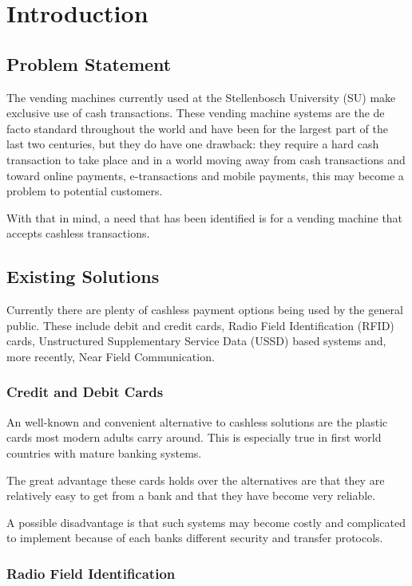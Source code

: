 \chapter{Introduction}

\section{Problem Statement}

The vending machines currently used at the Stellenbosch University (SU) make exclusive use of
cash transactions. These vending machine systems are the de facto standard throughout the
world and have been for the largest part of the last two centuries, but they do have one
drawback: they require a hard cash transaction to take place and in a world moving away from
cash transactions and toward online payments, e-transactions and mobile payments, this may
become a problem to potential customers.

With that in mind, a need that has been identified is for a vending machine that accepts
cashless transactions.

\section{Existing Solutions}

Currently there are plenty of cashless payment options being used by the general public. These
include debit and credit cards, Radio Field Identification (RFID) cards, Unstructured
Supplementary Service Data (USSD) based systems and, more recently, Near Field Communication.

\subsection{Credit and Debit Cards}

An well-known and convenient alternative to cashless solutions are the plastic cards most
modern adults carry around. This is especially true in first world countries with mature
banking systems. 

The great advantage these cards holds over the alternatives are that they are
relatively easy to get from a bank and that they have become very reliable. 

A possible disadvantage is that such systems may become costly and complicated to implement
because of each banks different security and transfer protocols.

\subsection{Radio Field Identification}

